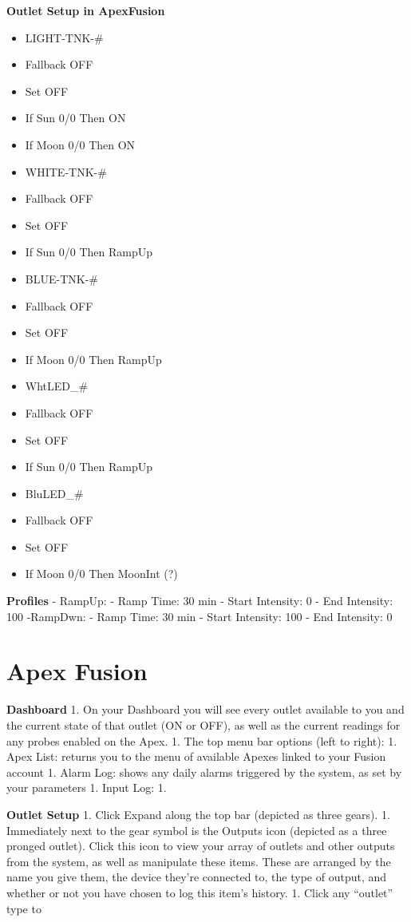 \documentclass[]{book}
\providecommand{\tightlist}{%
  \setlength{\itemsep}{0pt}\setlength{\parskip}{0pt}}
\begin{document}
\textbf{Outlet Setup in ApexFusion}

\begin{itemize}
\tightlist
\item
  LIGHT-TNK-\#
\item
  Fallback OFF
\item
  Set OFF
\item
  If Sun 0/0 Then ON
\item
  If Moon 0/0 Then ON
\item
  WHITE-TNK-\#
\item
  Fallback OFF
\item
  Set OFF
\item
  If Sun 0/0 Then RampUp
\item
  BLUE-TNK-\#
\item
  Fallback OFF
\item
  Set OFF
\item
  If Moon 0/0 Then RampUp
\item
  WhtLED\_\#
\item
  Fallback OFF
\item
  Set OFF
\item
  If Sun 0/0 Then RampUp
\item
  BluLED\_\#
\item
  Fallback OFF
\item
  Set OFF
\item
  If Moon 0/0 Then MoonInt (?)
\end{itemize}

\textbf{Profiles} - RampUp: - Ramp Time: 30 min - Start Intensity: 0 -
End Intensity: 100 -RampDwn: - Ramp Time: 30 min - Start Intensity: 100
- End Intensity: 0

\chapter{Apex Fusion}\label{apex-fusion}

\textbf{Dashboard} 1. On your Dashboard you will see every outlet
available to you and the current state of that outlet (ON or OFF), as
well as the current readings for any probes enabled on the Apex. 1. The
top menu bar options (left to right): 1. Apex List: returns you to the
menu of available Apexes linked to your Fusion account 1. Alarm Log:
shows any daily alarms triggered by the system, as set by your
parameters 1. Input Log: 1.

\textbf{Outlet Setup} 1. Click Expand along the top bar (depicted as
three gears). 1. Immediately next to the gear symbol is the Outputs icon
(depicted as a three pronged outlet). Click this icon to view your array
of outlets and other outputs from the system, as well as manipulate
these items. These are arranged by the name you give them, the device
they're connected to, the type of output, and whether or not you have
chosen to log this item's history. 1. Click any ``outlet'' type to


\end{document}
